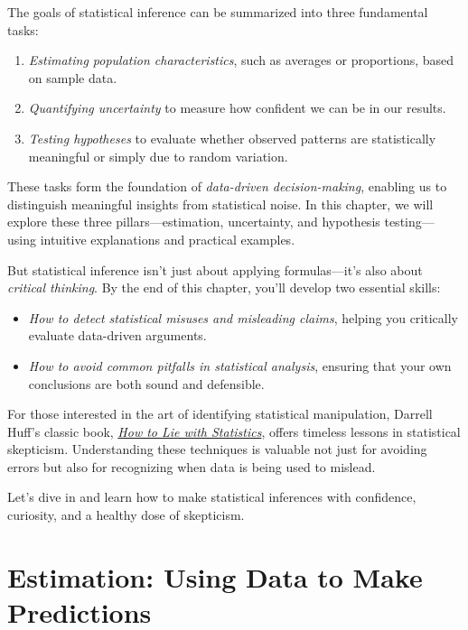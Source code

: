 \documentclass[
  11pt,
]{book}
\providecommand{\tightlist}{%
  \setlength{\itemsep}{0pt}\setlength{\parskip}{0pt}}
\theoremstyle{definition}
\theoremstyle{definition}
\theoremstyle{definition}
\theoremstyle{definition}
\theoremstyle{remark}
\begin{document}
The goals of statistical inference can be summarized into three fundamental tasks:

\begin{enumerate}
\def\labelenumi{\arabic{enumi}.}
\tightlist
\item
  \emph{Estimating population characteristics}, such as averages or proportions, based on sample data.\\
\item
  \emph{Quantifying uncertainty} to measure how confident we can be in our results.\\
\item
  \emph{Testing hypotheses} to evaluate whether observed patterns are statistically meaningful or simply due to random variation.
\end{enumerate}

These tasks form the foundation of \emph{data-driven decision-making}, enabling us to distinguish meaningful insights from statistical noise. In this chapter, we will explore these three pillars---estimation, uncertainty, and hypothesis testing---using intuitive explanations and practical examples.

But statistical inference isn't just about applying formulas---it's also about \emph{critical thinking}. By the end of this chapter, you'll develop two essential skills:

\begin{itemize}
\tightlist
\item
  \emph{How to detect statistical misuses and misleading claims}, helping you critically evaluate data-driven arguments.\\
\item
  \emph{How to avoid common pitfalls in statistical analysis}, ensuring that your own conclusions are both sound and defensible.
\end{itemize}

For those interested in the art of identifying statistical manipulation, Darrell Huff's classic book, \href{https://www.goodreads.com/book/show/51291.How_to_Lie_with_Statistics}{\emph{How to Lie with Statistics}}, offers timeless lessons in statistical skepticism. Understanding these techniques is valuable not just for avoiding errors but also for recognizing when data is being used to mislead.

Let's dive in and learn how to make statistical inferences with confidence, curiosity, and a healthy dose of skepticism.

\section{Estimation: Using Data to Make Predictions}\label{estimation-using-data-to-make-predictions}
\end{document}

